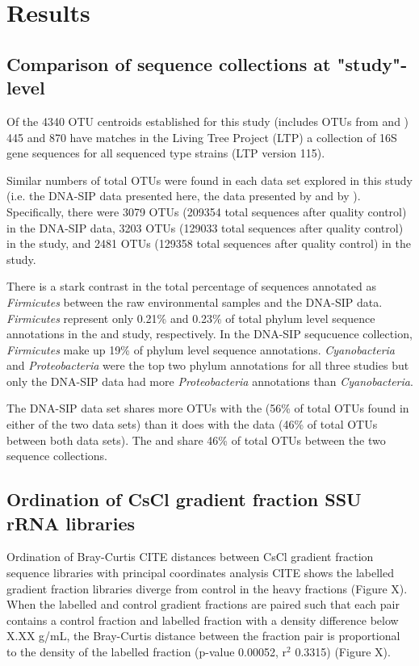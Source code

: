 \section{Results}

\subsection{Comparison of sequence collections at "study"-level}
Of the 4340 OTU centroids established for this study (includes OTUs from \citet{Steven_2013} and \cite{Garcia_Pichel_2013}) 445 and 870 have matches in the Living Tree Project (LTP) a collection of 16S gene sequences for all sequenced type strains \cite{Yarza_2008} (LTP version 115).

Similar numbers of total OTUs were found in each data set explored in this study (i.e. the DNA-SIP data presented here, the data presented by \citet{Steven_2013} and by \citet{Garcia_Pichel_2013}). Specifically, there were 3079 OTUs (209354 total sequences after quality control) in the DNA-SIP data, 3203 OTUs (129033 total sequences after quality control) in the \citet{Garcia_Pichel_2013} study, and 2481 OTUs (129358 total sequences after quality control) in the \citet{Steven_2013} study.

There is a stark contrast in the total percentage of sequences annotated as \textit{Firmicutes} between the raw environmental samples and the DNA-SIP data. \textit{Firmicutes} represent only 0.21\% and 0.23\% of total phylum level sequence annotations in the \citet{Steven_2013} and \citet{Garcia_Pichel_2013} study, respectively. In the DNA-SIP sequcuence collection, \textit{Firmicutes} make up 19\% of phylum level sequence annotations. \textit{Cyanobacteria} and \textit{Proteobacteria} were the top two phylum annotations for all three studies but only the DNA-SIP data had more \textit{Proteobacteria} annotations than \textit{Cyanobacteria}.

The DNA-SIP data set shares more OTUs with the \citet{Steven_2013} (56\% of total OTUs found in either of the two data sets) than it does with the \citet{Garcia_Pichel_2013} data (46\% of total OTUs between both data sets). The \cite{Steven_2013} and \cite{Garcia_Pichel_2013} share 46\% of total OTUs between the two sequence collections.

\subsection{Ordination of CsCl gradient fraction SSU rRNA libraries}
Ordination of Bray-Curtis CITE distances between CsCl gradient fraction sequence libraries with principal coordinates analysis CITE shows the labelled gradient fraction libraries diverge from control in the heavy fractions (Figure X). When the labelled and control gradient fractions are paired such that each pair contains a control fraction and labelled fraction with a density difference below X.XX g/mL, the Bray-Curtis distance between the fraction pair is proportional to the density of the labelled fraction (p-value 0.00052, r$^{2}$ 0.3315) (Figure X).

